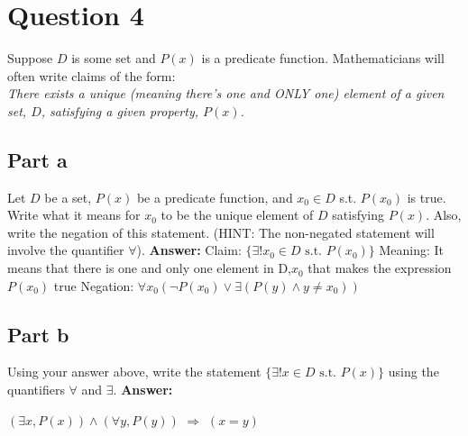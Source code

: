 \documentclass[12pt]{article}
\begin{document}
\section*{Question 4}

Suppose $D$ is some set and $P(x)$ is a predicate function. Mathematicians will often write claims of the form:\\

{\it\noindent There exists a unique (meaning there's one and ONLY one) element of a given set, $D$, satisfying a given property, $P(x)$.}
\subsection*{Part a}
Let $D$ be a set, $P(x)$ be a predicate function, and $x_{0}\in D$ s.t. $P(x_{0})$ is true. Write what it means for $x_{0}$ to be the unique element of $D$ satisfying $P(x)$. Also, write the negation of this statement. (HINT: The non-negated statement will involve the quantifier $\forall$).\newline
 \newline
{\noindent\bf Answer:}
{
 \newline
Claim: $\{\exists ! x_{0}\in D\text{ s.t. }P(x_{0})\}$\newline
\newline
Meaning: It means that there is one and only one element in D,$x_{0}$ that makes the expression $P(x_{0})$ true\newline
Negation: $\forall  x_{0}(\neg P(x_{0}) \lor \exists (P(y) \land y \neq x_{0}))$\newline
}
\subsection*{Part b}
Using your answer above, write the statement $\{\exists ! x\in D\text{ s.t. }P(x)\}$ using the quantifiers $\forall$ and $\exists$.\newline
{\noindent\bf Answer:}

{$(\exists x,P(x)) \land (\forall y,P(y))$ $\Rightarrow$ $(x=y)$
 \newline
 \newline
 \newline
 \newline
 \newline
 \newline
 \newline
 \newline
 \newline
 \newline
 \newline
 \newline
}
\end{document}
